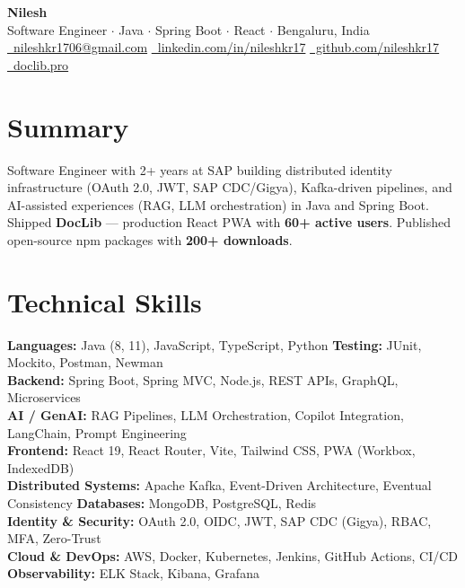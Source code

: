 \documentclass[letterpaper,10.5pt]{article}
\begin{document}
\begin{center}
  {\fontsize{20}{22}\selectfont\textbf{Nilesh}}\\[2pt]
  {\small Software Engineer $\cdot$ Java $\cdot$ Spring Boot $\cdot$ React $\cdot$ Bengaluru, India}\\[2pt]
  {\footnotesize
  \href{mailto:nileshkr1706@gmail.com}{\faEnvelope\ nileshkr1706@gmail.com}\enspace\textbar\enspace
  \href{https://in.linkedin.com/in/nileshkr17/}{\faLinkedin\ linkedin.com/in/nileshkr17}\enspace\textbar\enspace
  \href{https://github.com/nileshkr17}{\faGithub\ github.com/nileshkr17}\enspace\textbar\enspace
  \href{https://doclib.pro}{\faGlobe\ doclib.pro}}
\end{center}

\vspace{-2pt}

\section{Summary}
{\small Software Engineer with 2+ years at SAP building distributed identity infrastructure (OAuth 2.0, JWT, SAP CDC/Gigya), Kafka-driven pipelines, and AI-assisted experiences (RAG, LLM orchestration) in Java and Spring Boot. Shipped \textbf{DocLib} --- production React PWA with \textbf{60+ active users}. Published open-source npm packages with \textbf{200+ downloads}.}

\vspace{4pt}
\vspace{4pt}
\vspace{4pt}
\section{Technical Skills}
{\small
\textbf{Languages:} Java (8, 11), JavaScript, TypeScript, Python \quad \textbf{Testing:} JUnit, Mockito, Postman, Newman \\
\textbf{Backend:} Spring Boot, Spring MVC, Node.js, REST APIs, GraphQL, Microservices \\
\textbf{AI / GenAI:} RAG Pipelines, LLM Orchestration, Copilot Integration, LangChain, Prompt Engineering \\
\textbf{Frontend:} React 19, React Router, Vite, Tailwind CSS, PWA (Workbox, IndexedDB) \\
\textbf{Distributed Systems:} Apache Kafka, Event-Driven Architecture, Eventual Consistency \quad \textbf{Databases:} MongoDB, PostgreSQL, Redis \\
\textbf{Identity \& Security:} OAuth 2.0, OIDC, JWT, SAP CDC (Gigya), RBAC, MFA, Zero-Trust \\
\textbf{Cloud \& DevOps:} AWS, Docker, Kubernetes, Jenkins, GitHub Actions, CI/CD \quad \textbf{Observability:} ELK Stack, Kibana, Grafana
}
\end{document}
